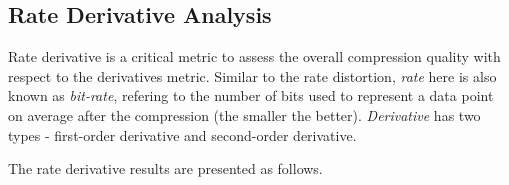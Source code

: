 \subsection{Rate Derivative Analysis}

Rate derivative is a critical metric to assess the overall compression quality with respect to the derivatives metric. Similar to the rate distortion, \emph{rate} here is also known as \emph{bit-rate}, refering to the number of bits used to represent a data point on average after the compression (the smaller the better). \emph{Derivative} has two types - first-order derivative and second-order derivative.





The rate derivative results are presented as follows.

